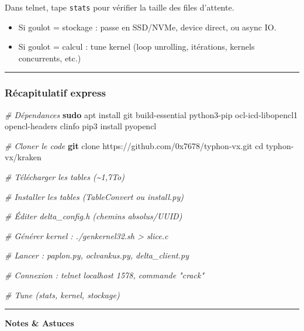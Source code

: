 \documentclass[
  french,
]{article}
\newenvironment{Shaded}{\begin{snugshade}}{\end{snugshade}}
\newcommand{\BuiltInTok}[1]{#1}
\newcommand{\CommentTok}[1]{\textcolor[rgb]{0.56,0.35,0.01}{\textit{#1}}}
\newcommand{\ExtensionTok}[1]{#1}
\newcommand{\FunctionTok}[1]{\textcolor[rgb]{0.13,0.29,0.53}{\textbf{#1}}}
\newcommand{\NormalTok}[1]{#1}
\providecommand{\tightlist}{%
  \setlength{\itemsep}{0pt}\setlength{\parskip}{0pt}}
\begin{document}
Dans telnet, tape \texttt{stats} pour vérifier la taille des files
d'attente.

\begin{itemize}
\tightlist
\item
  Si goulot = stockage : passe en SSD/NVMe, device direct, ou async IO.
\item
  Si goulot = calcul : tune kernel (loop unrolling, itérations, kernels
  concurrents, etc.)
\end{itemize}

\begin{center}\rule{0.5\linewidth}{0.5pt}\end{center}

\subsubsection{Récapitulatif express}\label{ruxe9capitulatif-express}

\begin{Shaded}
\begin{Highlighting}[]
\CommentTok{\# Dépendances}
\FunctionTok{sudo}\NormalTok{ apt install git build{-}essential python3{-}pip ocl{-}icd{-}libopencl1 opencl{-}headers clinfo}
\ExtensionTok{pip3}\NormalTok{ install pyopencl}

\CommentTok{\# Cloner le code}
\FunctionTok{git}\NormalTok{ clone https://github.com/0x7678/typhon{-}vx.git}
\BuiltInTok{cd}\NormalTok{ typhon{-}vx/kraken}

\CommentTok{\# Télécharger les tables (\textasciitilde{}1,7To)}

\CommentTok{\# Installer les tables (TableConvert ou install.py)}

\CommentTok{\# Éditer delta\_config.h (chemins absolus/UUID)}

\CommentTok{\# Générer kernel : ./genkernel32.sh \textgreater{} slice.c}

\CommentTok{\# Lancer : paplon.py, oclvankus.py, delta\_client.py}

\CommentTok{\# Connexion : telnet localhost 1578, commande "crack"}

\CommentTok{\# Tune (stats, kernel, stockage)}
\end{Highlighting}
\end{Shaded}

\begin{center}\rule{0.5\linewidth}{0.5pt}\end{center}

\textbf{Notes \& Astuces}
\end{document}
